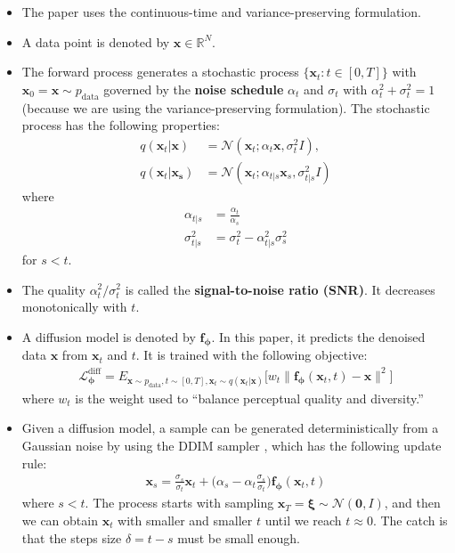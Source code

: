 \documentclass[10pt]{article}
\newcommand{\ve}[1]{\mathbf{#1}}
\newcommand{\ves}[1]{\boldsymbol{#1}}
\newcommand{\mrm}[1]{\mathrm{#1}}
\newcommand{\mcal}[1]{\mathcal{#1}}
\newcommand{\Real}{\mathbb{R}}
\newcommand{\data}{\mathrm{data}}
\begin{document}
\begin{itemize}
  \item The paper uses the continuous-time \cite{Song:2021,Karras:2022} and variance-preserving \cite{Salimans:2022} formulation.
  
  \item A data point is denoted by $\ve{x} \in \Real^N$.
  
  \item The forward process generates a stochastic process $\{ \ve{x}_t : t \in [0,T] \}$ with $\ve{x}_0 = \ve{x} \sim p_{\data}$ governed by the {\bf noise schedule} $\alpha_t$ and $\sigma_t$ with $\alpha_t^2 + \sigma_t^2 = 1$ (because we are using the variance-preserving formulation). The stochastic process has the following properties:
  \begin{align*}
    q(\ve{x}_t|\ve{x}) &= \mcal{N}(\ve{x}_t; \alpha_t \ve{x}, \sigma_t^2 I), \\
    q(\ve{x}_t|\ve{x_s}) &= \mcal{N}(\ve{x}_t; \alpha_{t|s} \ve{x}_s, \sigma_{t|s}^2 I)    
  \end{align*}
  where
  \begin{align*}
    \alpha_{t|s} &= \frac{\alpha_t}{\alpha_s} \\
    \sigma_{t|s}^2 &= \sigma_t^2 - \alpha_{t|s}^2 \sigma_s^2
  \end{align*}
  for $s < t$.

  \item The quality $\alpha_t^2 / \sigma_t^2$ is called the {\bf signal-to-noise ratio (SNR)}. It decreases monotonically with $t$.
  
  \item A diffusion model is denoted by $\ve{f}_{\ves{\phi}}$. In this paper, it predicts the denoised data $\ve{x}$ from $\ve{x}_t$ and $t$. It is trained with the following objective:
  \begin{align*}
    \mcal{L}_{\ves{\phi}}^{\mrm{diff}} = E_{\ve{x} \sim p_{\data}, t \sim [0,T], \ve{x}_t \sim q(\ve{x}_t|\ve{x})} \big[w_t \| \ve{f}_{\ves{\phi}}(\ve{x}_t, t) - \ve{x} \|^2\big]
  \end{align*}
  where $w_t$ is the weight used to ``balance perceptual quality and diversity.''

  \item Given a diffusion model, a sample can be generated deterministically from a Gaussian noise by using the DDIM sampler \cite{Song:DDIM:2020}, which has the following update rule:
  \begin{align*}
    \ve{x}_s = \frac{\sigma_s}{\sigma_t} \ve{x}_t + \bigg( \alpha_s - \alpha_t \frac{\sigma_s}{\sigma_t} \bigg) \ve{f}_{\ves{\phi}}(\ve{x}_t, t)
  \end{align*}
  where $s < t$. The process starts with sampling $\ve{x}_T = \ves{\xi} \sim \mcal{N}(\ve{0},I)$, and then we can obtain $\ve{x}_t$ with smaller and smaller $t$ until we reach $t \approx 0$. The catch is that the steps size $\delta = t - s$ must be small enough.
\end{itemize}
\end{document}
